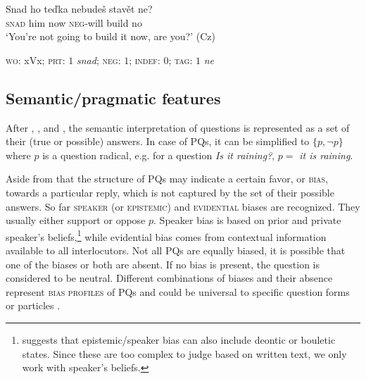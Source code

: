 \documentclass[output=paper,colorlinks,citecolor=brown]{langscibook}
\begin{document}
\begin{exe}
\ex \label{ex-formal-annotation} \gll Snad ho teďka nebudeš stavět ne? \\
\textsc{snad} him now \textsc{neg}-will build no \\
\glt `You're not going to build it now, are you?' \hfill (Cz)
\begin{xlist}
     \textsc{wo}: xVx; \textsc{prt}: $1$ \textit{snad}; \textsc{neg}: $1$; \textsc{indef}: $0$; \textsc{tag}: $1$ \textit{ne}
\end{xlist}
\end{exe}

\subsection{Semantic/pragmatic features} \label{sec-semantic-pragmatic-features}
After \citet{Hamblin1973}, \citet{Karttunen1977}, and \citet{Groenendijk1984}, the semantic interpretation of questions is represented as a set of their (true or possible) answers. In case of PQs, it can be simplified to $\{p, \neg p\}$ where $p$ is a question radical, e.g. for a question \textit{Is it raining?}, $p =$ \textit{it is raining}. 



Aside from that the structure of PQs may indicate a certain favor, or \textsc{bias}, towards a particular reply, which is not captured by the set of their possible answers. So far \textsc{speaker} (or \textsc{epistemic}) and \textsc{evidential} biases are recognized. They usually either support or oppose $p$. Speaker bias is based on prior and private speaker's beliefs,\footnote{\citet{Sudo2013} suggests that epistemic/speaker bias can also include deontic or bouletic states. Since these are too complex to judge based on written text, we only work with speaker's beliefs.} while evidential bias comes from contextual information available to all interlocutors. Not all PQs are equally biased, it is possible that one of the biases or both are absent. If no bias is present, the question is considered to be neutral. Different combinations of biases and their absence represent \textsc{bias profiles} of PQs and could be universal to specific question forms or particles \citep{Sudo2013, Gaertner2017}.
\end{document}
